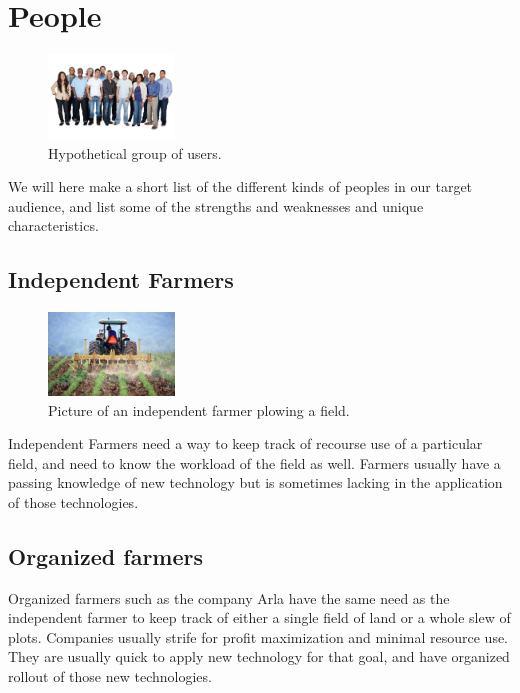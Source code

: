 \section{People}
\begin{figure}
\centering
\vspace{-50pt}
\includegraphics[width=0.3\textwidth, keepaspectratio]{images/pact/people}
\caption{\label{fig:people}Hypothetical group of users.}
\vspace{-50pt}
\end{figure}
We will here make a short list of the different kinds of peoples in our target audience, and list some of the strengths and weaknesses and unique characteristics. 

\subsection{Independent Farmers}
\begin{figure}
\centering
\includegraphics[width=0.3\textwidth, keepaspectratio]{images/pact/tractor}
\caption{\label{fig:independantfarmers}Picture of an independent farmer plowing a field.}
\vspace{-40pt}
\end{figure}
Independent Farmers need a way to keep track of recourse use of a particular field, and need to know the workload of the field as well. Farmers usually have a passing knowledge of new technology but is sometimes lacking in the application of those technologies.

\subsection{Organized farmers}
Organized farmers such as the company Arla have the same need as the independent farmer to keep track of either a single field of land or a whole slew of plots. Companies usually strife for profit maximization and minimal resource use. They are usually quick to apply new technology for that goal, and have organized rollout of those new technologies.

